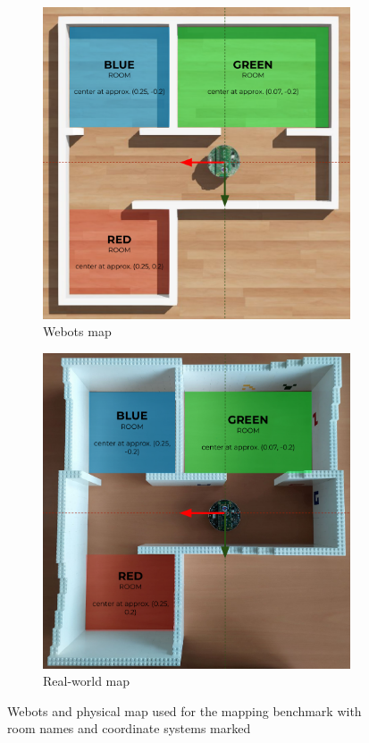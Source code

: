 \begin{figure}[H]
\centering
\begin{subfigure}{.452\textwidth}
  \centering
  \includegraphics[width=0.97\linewidth]{results/figures/map_webots}
  \caption{Webots map}
  \label{fig:results:map:map_webots}
\end{subfigure}%
\begin{subfigure}{.448\textwidth}
  \centering
  \includegraphics[width=0.97\linewidth]{results/figures/map_real_world}
  \caption{Real-world map}
  \label{fig:results:map:map_real_world}
\end{subfigure}
\caption[Webots map used for the mapping benchmark]{Webots and physical map used for the mapping benchmark with room names and coordinate systems marked}
\label{fig:results:map}
\end{figure}


